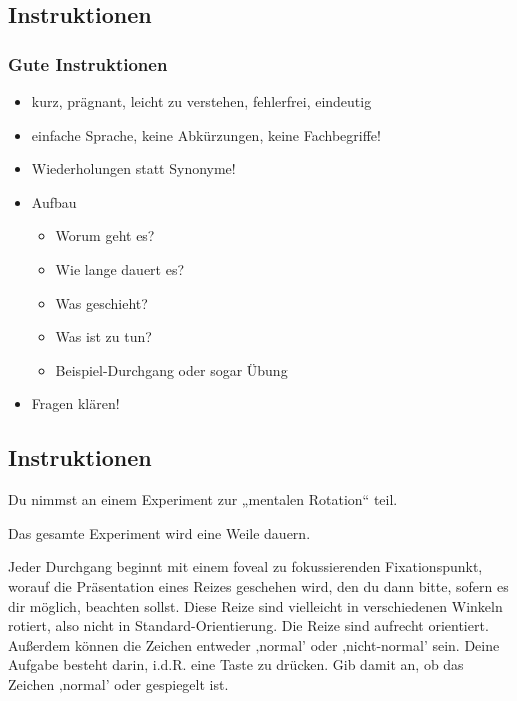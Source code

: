 \documentclass[
]{book}
\begin{document}
\hypertarget{instruktionen}{%
\subsection{Instruktionen}\label{instruktionen}}

\hypertarget{gute-instruktionen}{%
\subsubsection{Gute Instruktionen}\label{gute-instruktionen}}

\begin{itemize}
\item
  kurz, prägnant, leicht zu verstehen, fehlerfrei, eindeutig
\item
  einfache Sprache, keine Abkürzungen, keine Fachbegriffe!
\item
  Wiederholungen statt Synonyme!
\item
  Aufbau

  \begin{itemize}
  \item
    Worum geht es?
  \item
    Wie lange dauert es?
  \item
    Was geschieht?
  \item
    Was ist zu tun?
  \item
    Beispiel-Durchgang oder sogar Übung
  \end{itemize}
\item
  Fragen klären!
\end{itemize}

\hypertarget{instruktionen-1}{%
\subsection{Instruktionen}\label{instruktionen-1}}

Du nimmst an einem Experiment zur „mentalen Rotation`` teil.

Das gesamte Experiment wird eine Weile dauern.

Jeder Durchgang beginnt mit einem foveal zu fokussierenden Fixationspunkt, worauf die Präsentation eines Reizes geschehen wird, den du dann bitte, sofern es dir möglich, beachten sollst. Diese Reize
sind vielleicht in verschiedenen Winkeln rotiert, also nicht in Standard-Orientierung. Die Reize sind aufrecht orientiert. Außerdem können
die Zeichen entweder ‚normal' oder ‚nicht-normal' sein.
Deine Aufgabe besteht darin, i.d.R. eine Taste zu drücken.
Gib damit an, ob das Zeichen ‚normal' oder gespiegelt ist.
\end{document}
